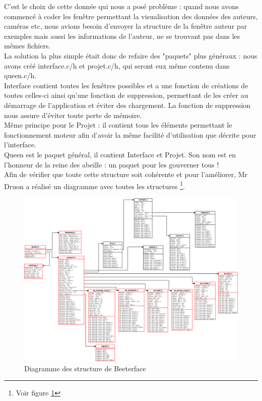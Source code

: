 \documentclass[11pt,french,a4paper]{report}
\begin{document}
C'est le choix de cette donnée qui nous a posé problème : quand nous avons commencé
à coder les fenêtre permettant la visualisation des données des auteurs, caméras etc, nous avions besoin d'envoyer la structure
de la fenêtre auteur par exemples mais aussi les informations de l'auteur, ne se trouvant pas dans les mêmes fichiers.  \\
La solution la plus simple était donc de refaire des "paquets" plus généraux : nous avons créé interface.c/h et projet.c/h, qui seront eux
même contenu dans queen.c/h. \\
Interface contient toutes les fenêtres possibles et a une fonction de créations de toutes celles-ci ainsi qu'une fonction de suppression, 
permettant de les créer au démarrage de l'application et éviter des chargement. La fonction de suppression nous assure d'éviter toute perte de mémoire.\\
Même principe pour le Projet : il contient tous les éléments permettant le fonctionnement moteur afin d'avoir la même facilité
d'utilisation que décrite pour l'interface. \\
Queen est le paquet général, il contient Interface et Projet. Son nom est en l'honneur de la reine des abeille : 
un paquet pour les gouverner tous ! \\
Afin de vérifier que toute cette structure soit cohérente et pour l'améliorer, Mr Druon a réalisé un diagramme 
avec toutes les structures \footnote{Voir figure \ref{dia_struct}}.
\begin{landscape}
\begin{figure}[!h]
    \centering
    \includegraphics[scale=0.3]{../images/dia/beeterface_structs.png}
    \caption{Diagramme des structure de Beeterface}
    \label{dia_struct}
\end{figure}
\end{landscape}
\end{document}
